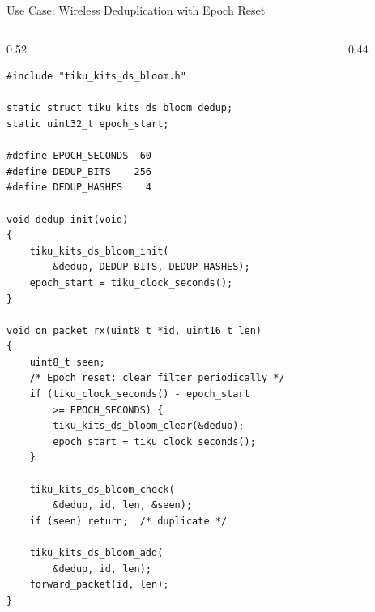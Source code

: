 \documentclass[aspectratio=169, 10pt]{beamer}
\begin{document}
\begin{frame}[fragile]{Use Case: Wireless Deduplication with Epoch Reset}
\begin{columns}[T]
\begin{column}{0.52\textwidth}
\begin{lstlisting}[style=cstyle,
  title={Epoch-based dedup for wireless sensor network}]
#include "tiku_kits_ds_bloom.h"

static struct tiku_kits_ds_bloom dedup;
static uint32_t epoch_start;

#define EPOCH_SECONDS  60
#define DEDUP_BITS    256
#define DEDUP_HASHES    4

void dedup_init(void)
{
    tiku_kits_ds_bloom_init(
        &dedup, DEDUP_BITS, DEDUP_HASHES);
    epoch_start = tiku_clock_seconds();
}

void on_packet_rx(uint8_t *id, uint16_t len)
{
    uint8_t seen;
    /* Epoch reset: clear filter periodically */
    if (tiku_clock_seconds() - epoch_start
        >= EPOCH_SECONDS) {
        tiku_kits_ds_bloom_clear(&dedup);
        epoch_start = tiku_clock_seconds();
    }

    tiku_kits_ds_bloom_check(
        &dedup, id, len, &seen);
    if (seen) return;  /* duplicate */

    tiku_kits_ds_bloom_add(
        &dedup, id, len);
    forward_packet(id, len);
}
\end{lstlisting}
\end{column}

\begin{column}{0.44\textwidth}
\begin{center}
\end{center}


\end{column}
\end{columns}
\end{frame}
\end{document}

